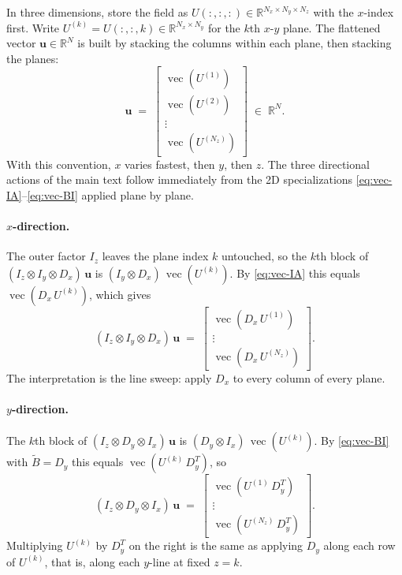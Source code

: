 \documentclass[11pt]{article}
\newcommand{\kron}{\otimes}
\newcommand{\Dx}{D_{x}}
\newcommand{\Dy}{D_{y}}
\newcommand{\Ix}{I_{x}}
\newcommand{\Iy}{I_{y}}
\newcommand{\Iz}{I_{z}}
\newcommand{\R}{\mathbb{R}}
\newcommand{\vect}{\operatorname{vec}}
\newcommand{\Nall}{N}
\begin{document}
\begin{appendices}
In three dimensions, store the field as $U(:,:,:) \in \R^{N_x \times
N_y \times N_z}$ with the $x$-index first.  Write $U^{(k)} = U(:,:,k)
\in \R^{N_x \times N_y}$ for the $k$th $x$-$y$ plane.  The flattened
vector $\bm{u} \in \R^{\Nall}$ is built by stacking the columns
within each plane, then stacking the planes:
\begin{equation}
\label{eq:3d-flat}
  \bm{u}
  \;=\;
  \begin{bmatrix}
    \vect(U^{(1)}) \\[2pt]
    \vect(U^{(2)}) \\[2pt]
    \vdots \\[2pt]
    \vect(U^{(N_z)})
  \end{bmatrix}
  \;\in\; \R^{\Nall}.
\end{equation}
With this convention, $x$ varies fastest, then $y$, then $z$.  The
three directional actions of the main text follow immediately from
the 2D specializations \eqref{eq:vec-IA}--\eqref{eq:vec-BI} applied
plane by plane.

\paragraph{$x$-direction.}
The outer factor $\Iz$ leaves the plane index $k$ untouched, so the
$k$th block of $(\Iz \kron \Iy \kron \Dx)\,\bm{u}$ is
$(\Iy \kron \Dx)\,\vect(U^{(k)})$.  By \eqref{eq:vec-IA} this equals
$\vect(\Dx\,U^{(k)})$, which gives
\begin{equation}
\label{eq:app-x-action}
  (\Iz \kron \Iy \kron \Dx)\,\bm{u}
  \;=\;
  \begin{bmatrix}
    \vect(\Dx\,U^{(1)}) \\[2pt]
    \vdots \\[2pt]
    \vect(\Dx\,U^{(N_z)})
  \end{bmatrix}.
\end{equation}
The interpretation is the line sweep: apply $\Dx$ to every column of
every plane.

\paragraph{$y$-direction.}
The $k$th block of $(\Iz \kron \Dy \kron \Ix)\,\bm{u}$ is
$(\Dy \kron \Ix)\,\vect(U^{(k)})$.  By \eqref{eq:vec-BI} with
$\tilde B = \Dy$ this equals $\vect(U^{(k)}\,\Dy^T)$, so
\begin{equation}
\label{eq:app-y-action}
  (\Iz \kron \Dy \kron \Ix)\,\bm{u}
  \;=\;
  \begin{bmatrix}
    \vect(U^{(1)}\,\Dy^T) \\[2pt]
    \vdots \\[2pt]
    \vect(U^{(N_z)}\,\Dy^T)
  \end{bmatrix}.
\end{equation}
Multiplying $U^{(k)}$ by $\Dy^T$ on the right is the same as applying
$\Dy$ along each row of $U^{(k)}$, that is, along each $y$-line at
fixed $z = k$.


\end{appendices}
\end{document}
